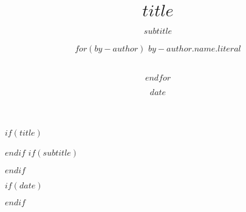 $if(title)$
\title{$title$}
$endif$
$if(subtitle)$
\subtitle{$subtitle$}
$endif$


\author{
$for(by-author)$
\alignauthor $by-author.name.literal$ \\
        \\
\and $endfor$
}

$if(date)$
\date{$date$}
$endif$

\permission{}
\conferenceinfo{} {}
\CopyrightYear{}
\crdata{}